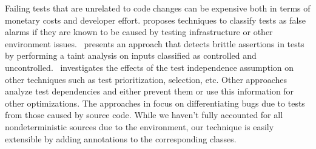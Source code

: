 Failing tests that are unrelated to code changes can be expensive both in terms of monetary costs and
developer effort. \cite{Herzig:2015:EDF:2819009.2819018} proposes techniques to classify tests as false alarms
if they are known to be caused by testing infrastructure or other environment issues.~\cite{Huo:2014:IOQ:2635868.2635917}
presents an approach that detects brittle assertions in tests by performing a taint analysis on inputs classified as 
controlled and uncontrolled.~\cite{ZhangJWMLEN2014} investigates the
effects of the test independence assumption
on other techniques such as test prioritization, selection, etc. Other approaches~\cite{BellKMD2015,GyoriSHM2015}
analyze test dependencies and either prevent them or use this information for other optimizations.
The approaches in \cite{Dan:2013:10.1007/978-3-642-39038-8_25,Vahabzadeh:2015:7332456} focus on differentiating bugs due to tests
from those caused by source code. While we haven't fully accounted for all nondeterministic sources due
to the environment, our technique is easily extensible by adding annotations to the corresponding classes.


